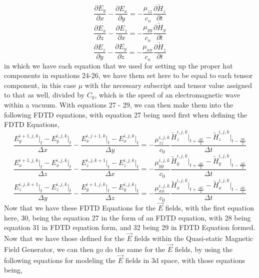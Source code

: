 \documentclass[]{article}
\begin{document}
\begin{equation}
\frac{\partial{E}_y}{\partial{x}} - \frac{\partial{E}_x}{\partial{y}} = -\frac{\mu_{zz}}{c_{o}} \frac{\partial{\tilde{H}_z}}{\partial{t}}
\end{equation}
\begin{equation}
\frac{\partial{E}_x}{\partial{z}} - \frac{\partial{E}_z}{\partial{x}} = -\frac{\mu_{yy}}{c_{o}} \frac{\partial{\tilde{H}_y}}{\partial{t}}
\end{equation}
\begin{equation}
\frac{\partial{E}_z}{\partial{y}} - \frac{\partial{E}_y}{\partial{z}} = -\frac{\mu_{xx}}{c_{o}} \frac{\partial{\tilde{H}_z}}{\partial{t}}
\end{equation}
in which we have each equation that we used for setting up the proper hat components in equations 24-26, we have them set here to be equal to each tensor component, in this case $\mu$ with the necessary subscript and tensor value assigned to that as well, divided by $C_0$, which is the speed of an electromagnetic wave within a vacuum. With equations 27 - 29, we can then make them into the following FDTD equations, with equation 27 being used first when defining the FDTD Equations,
\begin{equation}
\frac{E_{y}^{i+1, j, k} \Big|_t - E_{y}^{i,j,k}\Big|_t}{\Delta{x}} - \frac{E_{x}^{i, j+1, k} \Big|_t - E_{x}^{i,j,k}\Big|_t}{\Delta{y}} = -\frac{\mu_{zz}^{i,j,k}}{c_0} \frac{\tilde{H}_{z}^{i,j,k}\Big|_{t+\frac{\Delta{L}}{2}} - \tilde{H}_{z}^{i,j,k}\Big|_{t - \frac{\Delta{L}}{2}}}{\Delta{t}}
\end{equation} 
\begin{equation}
\frac{E_{x}^{i+1, j, k} \Big|_t - E_{x}^{i,j,k}\Big|_t}{\Delta{z}} - \frac{E_{z}^{i, j, k+1} \Big|_t - E_{z}^{i,j,k}\Big|_t}{\Delta{x}} = -\frac{\mu_{yy}^{i,j,k}}{c_0} \frac{\tilde{H}_{y}^{i,j,k}\Big|_{t+\frac{\Delta{L}}{2}} - \tilde{H}_{y}^{i,j,k}\Big|_{t - \frac{\Delta{L}}{2}}}{\Delta{t}}
\end{equation}
\begin{equation}
\frac{E_{z}^{i, j, k+1} \Big|_t - E_{z}^{i,j,k}\Big|_t}{\Delta{y}} - \frac{E_{y}^{i+1, j, k} \Big|_t - E_{y}^{i,j,k}\Big|_t}{\Delta{z}} = -\frac{\mu_{xx}^{i,j,k}}{c_0} \frac{\tilde{H}_{x}^{i,j,k}\Big|_{t+\frac{\Delta{L}}{2}} - \tilde{H}_{x}^{i,j,k}\Big|_{t - \frac{\Delta{L}}{2}}}{\Delta{t}}
\end{equation}
Now that we have these FDTD Equations for the $\vec{E}$ fields, with the first equation here, 30, being the equation 27 in the form of an FDTD equation, with 28 being equation 31 in FDTD equation form, and 32 being 29 in FDTD Equation formed. Now that we have those defined for the $\vec{E}$ fields within the Quasi-static Magnetic Field Generator, we can then go do the same for the $\vec{E}$ fields, by using the following equations for modeling the $\vec{E}$ fields in 3d space, with those equations being,
\end{document}
